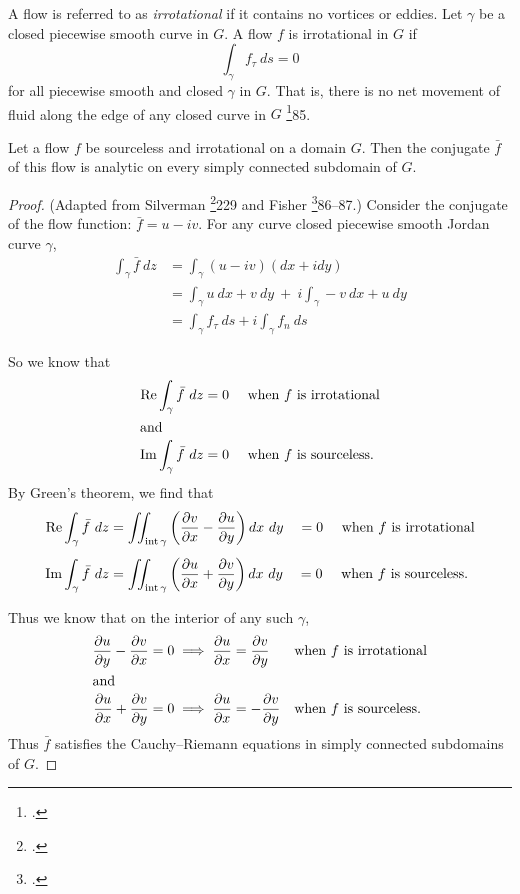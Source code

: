 \documentclass[letterpaper, twoside, 12 pt]{article}
\begin{document}
	\begin{definition}[Irrotational]
		A flow is referred to as \textit{irrotational} if it contains no vortices or eddies.
		Let $\gamma$ be a closed piecewise smooth curve in $G$.
		A flow $f$ is irrotational in $G$ if 
		\[
			\int_\gamma f_\tau \ ds = 0
		\]
		for all piecewise smooth and closed $\gamma$ in $G$.
		That is, there is no net movement of fluid along the edge of any closed curve in $G$ \footcite{fisher}{85}.
	\end{definition}


	\begin{theorem}
		Let a flow $f$ be sourceless and irrotational on a domain $G$.
		Then the conjugate $\bar f$ of this flow is analytic on every simply connected subdomain of $G$.
	\end{theorem}
	\begin{proof}
		(Adapted from Silverman \footcite{silverman}{229} and Fisher \footcite{fisher}{86--87}.)
		Consider the conjugate of the flow function: $\bar f = u - i v$.
		For any curve closed piecewise smooth Jordan curve $\gamma$,
		\begin{align*}
			\int_\gamma \bar f \ dz &= \int_\gamma (u - iv) (dx + i dy) \\
			&= \int_\gamma u\> dx + v\> dy \ + \ i \! \int_\gamma -v \> dx + u \> dy\\
			&= \int_\gamma f_\tau \ ds + i \int_\gamma f_n \ ds
		\end{align*}

		\clearpage

		So we know that 
		\begin{align*}
			\operatorname*{Re} \int_\gamma \bar f \ dz &= 0 \quad \text{ when $f$ is irrotational}\\
			\intertext{and}
			\operatorname*{Im} \int_\gamma \bar f \ dz &= 0 \quad \text{ when $f$ is sourceless.}
		\end{align*}
		By Green's theorem, we find that 
		\begin{align*}
			\operatorname*{Re} \int_\gamma \bar f \ dz &= \iint_{\operatorname*{int} \gamma} \left( \frac{\partial v}{\partial x} - \frac{\partial u}{\partial y} \right) dx\ dy 
			\quad = 0 \quad \text{ when $f$ is irrotational}\\[1 ex]
			\operatorname*{Im} \int_\gamma \bar f \ dz &= \iint_{\operatorname*{int} \gamma} \left( \frac{\partial u}{\partial x} + \frac{\partial v}{\partial y} \right) dx\ dy 
			\quad = 0 \quad \text{ when $f$ is sourceless.}
		\end{align*}

		Thus we know that on the interior of any such $\gamma$, 
		\begin{align*}
			\frac{\partial u}{\partial y} - \frac{\partial v}{\partial x} &= 0 \implies \frac{\partial u}{\partial x} = \frac{\partial v}{\partial y} & &\text{when $f$ is irrotational} \\
			\intertext{and}
			\frac{\partial u}{\partial x} + \frac{\partial v}{\partial y} &= 0 \implies \frac{\partial u}{\partial x} = - \frac{\partial v}{\partial y} & &\text{when $f$ is sourceless.} \\
		\end{align*}
		Thus $\bar f$ satisfies the Cauchy--Riemann equations in simply connected subdomains of $G$.
	\end{proof}
\end{document}
